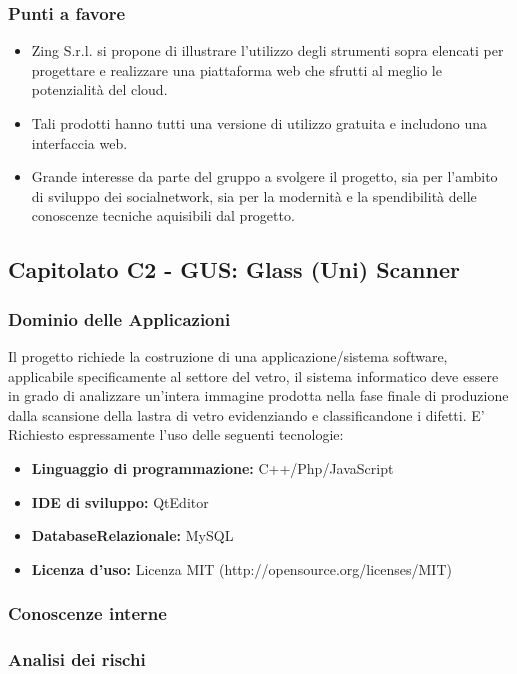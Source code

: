   \subsubsection{Punti a favore}
  \begin{itemize}
     \item Zing S.r.l. si propone di illustrare l’utilizzo degli strumenti sopra elencati per progettare e realizzare una piattaforma web che sfrutti al meglio le potenzialità del cloud.
     \item Tali prodotti hanno tutti una versione di utilizzo gratuita e includono una interfaccia web.
     \item Grande interesse da parte del gruppo a svolgere il progetto, sia per l'ambito di sviluppo dei socialnetwork, sia per la modernità e la spendibilità delle conoscenze tecniche aquisibili dal progetto.
  \end{itemize}
\subsection{Capitolato C2 - GUS: Glass (Uni) Scanner}
  \subsubsection{Dominio delle Applicazioni}
  Il progetto richiede la costruzione di una applicazione/sistema software, applicabile specificamente al settore del vetro, il  sistema  informatico deve essere in grado di analizzare un'intera immagine prodotta nella fase finale di produzione dalla scansione della lastra di vetro evidenziando e classificandone i difetti. E' Richiesto espressamente l'uso delle seguenti tecnologie:
  \begin{itemize}
  	\item \textbf{Linguaggio  di  programmazione:} C++/Php/JavaScript
  	\item \textbf{IDE di sviluppo:} QtEditor
  	\item \textbf{DatabaseRelazionale:} MySQL
  	\item \textbf{Licenza d'uso:} Licenza MIT (http://opensource.org/licenses/MIT)
  \end{itemize}
  \subsubsection{Conoscenze interne}
  
  \subsubsection{Analisi dei rischi}
  
